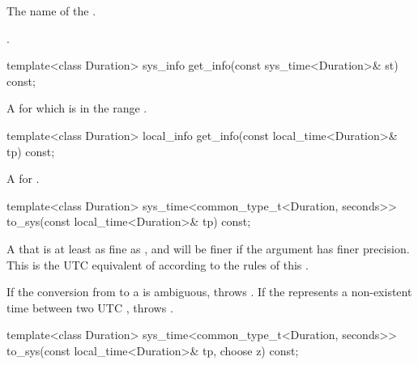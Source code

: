 \begin{itemdescr}
\pnum
\returns The name of the .

\pnum
\begin{example}
.
\end{example}
\end{itemdescr}

%
\begin{itemdecl}
template<class Duration>
  sys_info get_info(const sys_time<Duration>& st) const;
\end{itemdecl}

\begin{itemdescr}
\pnum
\returns
A   for which
 is in the range .
\end{itemdescr}

%
\begin{itemdecl}
template<class Duration>
  local_info get_info(const local_time<Duration>& tp) const;
\end{itemdecl}

\begin{itemdescr}
\pnum
\returns
A  for .
\end{itemdescr}

%
\begin{itemdecl}
template<class Duration>
  sys_time<common_type_t<Duration, seconds>>
    to_sys(const local_time<Duration>& tp) const;
\end{itemdecl}

\begin{itemdescr}
\pnum
\returns
A  that is at least as fine as ,
and will be finer if the argument  has finer precision.
This  is the UTC equivalent of 
according to the rules of this .

\pnum
\throws
If the conversion from  to a  is ambiguous,
throws .
If the  represents a non-existent time between two UTC ,
throws .
\end{itemdescr}

%
\begin{itemdecl}
template<class Duration>
  sys_time<common_type_t<Duration, seconds>>
    to_sys(const local_time<Duration>& tp, choose z) const;
\end{itemdecl}

